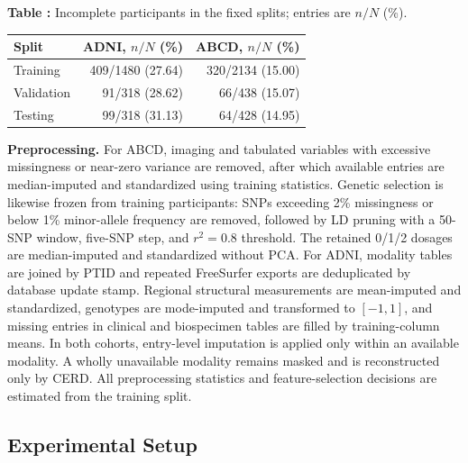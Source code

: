 \documentclass[a4paper,fleqn]{cas-dc}
\begin{document}
\begin{center}
\begin{minipage}{0.96\columnwidth}
\label{tab:missingness_counts}
\small\textbf{Table \thetable:} Incomplete participants in the fixed splits; entries are \(n/N\) (\%).
\vspace{4pt}

\centering
\small
\setlength{\tabcolsep}{4pt}
\renewcommand{\arraystretch}{1.30}
\begin{tabular*}{\columnwidth}{@{\extracolsep{\fill}}lrr@{}}
\toprule
Split & ADNI, \(n/N\) (\%) & ABCD, \(n/N\) (\%) \\
\midrule
Training & 409/1480 (27.64) & 320/2134 (15.00) \\
Validation & 91/318 (28.62) & 66/438 (15.07) \\
Testing & 99/318 (31.13) & 64/428 (14.95) \\
\bottomrule
\end{tabular*}
\end{minipage}
\end{center}

\label{sec:preprocessing}

\noindent\textbf{Preprocessing.}
For ABCD, imaging and tabulated variables with excessive missingness or near-zero variance are removed, after which available entries are median-imputed and standardized using training statistics. Genetic selection is likewise frozen from training participants: SNPs exceeding 2\% missingness or below 1\% minor-allele frequency are removed, followed by LD pruning with a 50-SNP window, five-SNP step, and \(r^2=0.8\) threshold. The retained 0/1/2 dosages are median-imputed and standardized without PCA. For ADNI, modality tables are joined by PTID and repeated FreeSurfer exports are deduplicated by database update stamp. Regional structural measurements are mean-imputed and standardized, genotypes are mode-imputed and transformed to \([-1,1]\), and missing entries in clinical and biospecimen tables are filled by training-column means. In both cohorts, entry-level imputation is applied only within an available modality. A wholly unavailable modality remains masked and is reconstructed only by CERD. All preprocessing statistics and feature-selection decisions are estimated from the training split.

\subsection{Experimental Setup}
\label{sec:experimental_setup}
\end{document}
